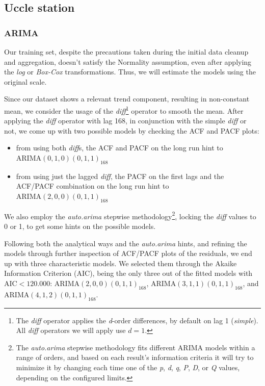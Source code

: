 \documentclass[12pt]{article}
\begin{document}
\subsection{Uccle station}
\subsubsection{ARIMA}
Our training set, despite the precautions taken during the initial data cleanup and aggregation, doesn't satisfy the Normality assumption, even after applying the \textit{log} or \textit{Box-Cox} transformations. Thus, we will estimate the models using the original scale.

Since our dataset shows a relevant trend component, resulting in non-constant mean, we consider the usage of the \textit{diff}\footnote{The \textit{diff} operator applies the \textit{d}-order differences, by default on lag 1 (\textit{simple}). All \textit{diff} operators we will apply use $d=1$.} operator to smooth the mean.
After applying the \textit{diff} operator with lag 168, in conjunction with the simple \textit{diff} or not, we come up with two possible models by checking the ACF and PACF plots:
\begin{itemize}[topsep=0.5em,itemsep=0em,partopsep=0.5em]
	\item from using both \textit{diff}s, the ACF and PACF on the long run hint to $\mathrm{ARIMA}(0,1,0)(0,1,1)_{168}$
	\item from using just the lagged \textit{diff}, the PACF on the first lags and the ACF/PACF combination on the long run hint to $\mathrm{ARIMA}(2,0,0)(0,1,1)_{168}$
\end{itemize}
We also employ the \textit{auto.arima} stepwise methodology\footnote{The \textit{auto.arima} stepwise methodology fits different ARIMA models within a range of orders, and based on each result's information criteria it will try to minimize it by changing each time one of the \textit{p}, \textit{d}, \textit{q}, \textit{P}, \textit{D}, or \textit{Q} values, depending on the configured limits.}, locking the \textit{diff} values to 0 or 1, to get some hints on the possible models.

Following both the analytical ways and the \textit{auto.arima} hints, and refining the models through further inspection of ACF/PACF plots of the residuals, we end up with three characteristic models. We selected them through the Akaike Information Criterion (AIC), being the only three out of the fitted models with $\mathrm{AIC} < 120.000$: $\mathrm{ARIMA}(2,0,0)(0,1,1)_{168}$, $\mathrm{ARIMA}(3,1,1)(0,1,1)_{168}$, and $\mathrm{ARIMA}(4,1,2)(0,1,1)_{168}$.
\end{document}
